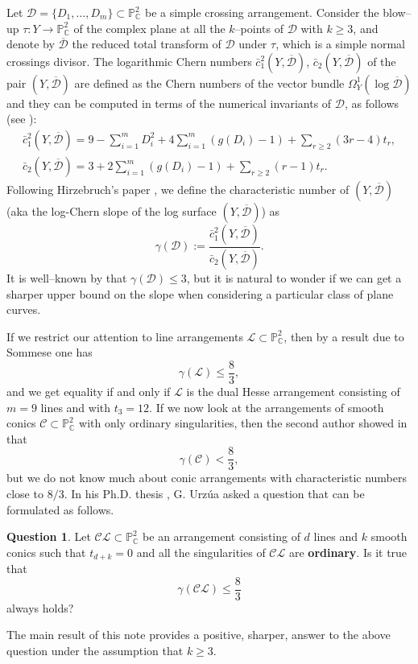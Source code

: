 \documentclass[12pt]{amsart}
\theoremstyle{plain}
\theoremstyle{definition}
\newtheorem{question}[thm]{Question}
\renewcommand\ge{\geqslant}
\renewcommand\geq{\geqslant}
\renewcommand\leq{\leqslant}
\begin{document}
Let $\mathcal{D} = \{D_{1}, \ldots, D_{m}\} \subset \mathbb{P}^{2}_{\mathbb{C}}$ be a simple crossing arrangement. Consider the blow--up $\tau \colon Y \rightarrow \mathbb{P}^{2}_{\mathbb{C}}$ of the complex plane at all the $k$--points of $\mathcal{D}$ with $k\geq 3$, and denote by $\overline{\mathcal{D}}$ the reduced total transform of $\mathcal{D}$ under $\tau$, which is a simple normal crossings divisor. The logarithmic Chern numbers $\bar{c}_{1}^{2}(Y,\overline{\mathcal{D}})$, $\bar{c}_{2}(Y,\overline{\mathcal{D}})$ of the  pair $(Y,\overline{\mathcal{D}})$ are defined as the Chern numbers of the vector bundle $\Omega^1_Y(\log \overline{\mathcal{D}})$ and 
they can be computed in terms of the numerical invariants of $\mathcal{D}$, as follows (see \cite[p. 27]{Urzua}):
\begin{gather}\label{eq: chern-general}
\bar{c}_{1}^{2}(Y,\overline{\mathcal{D}}) = 9 - \sum_{i=1}^{m}D_{i}^{2} + 4\sum_{i=1}^{m}(g(D_{i})-1) + \sum_{r\geq 2}(3r-4)t_{r},\\
\bar{c}_{2}(Y,\overline{\mathcal{D}}) = 3 + 2\sum_{i=1}^{m}(g(D_{i})-1) + \sum_{r\geq 2}(r-1)t_{r}.\nonumber 
\end{gather}
Following Hirzebruch's paper \cite{Hirzebruch}, we define the characteristic number of $(Y,\overline{\mathcal{D}})$ (aka the log-Chern slope of the log surface $(Y,\overline{\mathcal{D}})$) as
$$\gamma(\mathcal{D}) := \frac{\bar{c}_{1}^{2}(Y,\overline{\mathcal{D}})}{\bar{c}_{2}(Y,\overline{\mathcal{D}})}.$$
It is well--known by \cite{Miyaoka77,Wahl} that $\gamma(\mathcal{D}) \leq 3$, but it is natural to wonder if we can get a sharper upper bound on the slope when considering a particular class of plane curves.

If we restrict our attention to line arrangements $\mathcal{L} \subset \mathbb{P}^{2}_{\mathbb{C}}$, then by a result due to Sommese \cite[(5.3) Theorem]{Som} one has
$$\gamma(\mathcal{L}) \leq \frac{8}{3},$$
and we get  equality if and only if $\mathcal{L}$ is the dual Hesse arrangement consisting of $m=9$ lines and with $t_{3}=12$. If we now look at the arrangements of smooth conics $\mathcal{C} \subset \mathbb{P}^{2}_{\mathbb{C}}$ with only ordinary singularities, then the second author showed in \cite{Pokora1} that
$$\gamma(\mathcal{C}) < \frac{8}{3},$$
but we do not know much about conic arrangements with characteristic numbers close to $8/3$. In his Ph.D. thesis \cite[Section 2.5.1]{Urzua}, G. Urz\'ua asked a question that can be formulated as follows.
\begin{question}
Let $\mathcal{CL}\subset \mathbb{P}^{2}_{\mathbb{C}}$ be an arrangement consisting of $d$ lines and $k$ smooth conics such that $t_{d+k}=0$ and all the singularities of $\mathcal{CL}$ are \textbf{ordinary}. Is it true that
$$\gamma(\mathcal{CL}) \leq \frac{8}{3}$$
always holds?
\end{question}
The main result of this note provides a positive,  sharper, answer to the above question under the assumption that $k\ge 3$.
\end{document}

